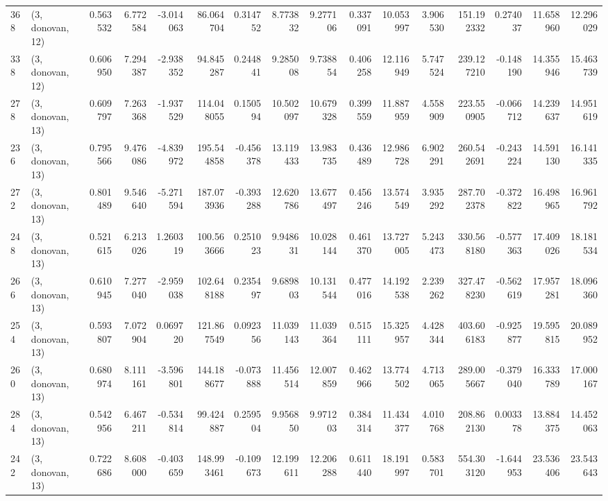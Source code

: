 \begin{tabular}{llrrrrrrrrrrrrrr}
368 &  (3, donovan, 12) &   0.563532 &   6.772584 &  -3.014063 &    86.064704 &   0.314752 &   8.773832 &   9.277106 &  0.337091 &  10.053997 &   3.906530 &   151.192332 &   0.274037 &  11.658960 &  12.296029 \\
338 &  (3, donovan, 12) &   0.606950 &   7.294387 &  -2.938352 &    94.845287 &   0.244841 &   9.285008 &   9.738854 &  0.406258 &  12.116949 &   5.747524 &   239.127210 &  -0.148190 &  14.355946 &  15.463739 \\
278 &  (3, donovan, 13) &   0.609797 &   7.263368 &  -1.937529 &   114.048055 &   0.150594 &  10.502097 &  10.679328 &  0.399559 &  11.887959 &   4.558909 &   223.550905 &  -0.066712 &  14.239637 &  14.951619 \\
236 &  (3, donovan, 13) &   0.795566 &   9.476086 &  -4.839972 &   195.544858 &  -0.456378 &  13.119433 &  13.983735 &  0.436489 &  12.986728 &   6.902291 &   260.542691 &  -0.243224 &  14.591130 &  16.141335 \\
272 &  (3, donovan, 13) &   0.801489 &   9.546640 &  -5.271594 &   187.073936 &  -0.393288 &  12.620786 &  13.677497 &  0.456246 &  13.574549 &   3.935292 &   287.702378 &  -0.372822 &  16.498965 &  16.961792 \\
248 &  (3, donovan, 13) &   0.521615 &   6.213026 &   1.260319 &   100.563666 &   0.251023 &   9.948631 &  10.028144 &  0.461370 &  13.727005 &   5.243473 &   330.568180 &  -0.577363 &  17.409026 &  18.181534 \\
266 &  (3, donovan, 13) &   0.610945 &   7.277040 &  -2.959038 &   102.648188 &   0.235497 &   9.689803 &  10.131544 &  0.477016 &  14.192538 &   2.239262 &   327.478230 &  -0.562619 &  17.957281 &  18.096360 \\
254 &  (3, donovan, 13) &   0.593807 &   7.072904 &   0.069720 &   121.867549 &   0.092356 &  11.039143 &  11.039364 &  0.515111 &  15.325957 &   4.428344 &   403.606183 &  -0.925877 &  19.595815 &  20.089952 \\
260 &  (3, donovan, 13) &   0.680974 &   8.111161 &  -3.596801 &   144.188677 &  -0.073888 &  11.456514 &  12.007859 &  0.462966 &  13.774502 &   4.713065 &   289.005667 &  -0.379040 &  16.333789 &  17.000167 \\
284 &  (3, donovan, 13) &   0.542956 &   6.467211 &  -0.534814 &    99.424887 &   0.259504 &   9.956850 &   9.971203 &  0.384314 &  11.434377 &   4.010768 &   208.862130 &   0.003378 &  13.884375 &  14.452063 \\
242 &  (3, donovan, 13) &   0.722686 &   8.608000 &  -0.403659 &   148.993461 &  -0.109673 &  12.199611 &  12.206288 &  0.611440 &  18.191997 &   0.583701 &   554.303120 &  -1.644953 &  23.536406 &  23.543643 \\

\end{tabular}
